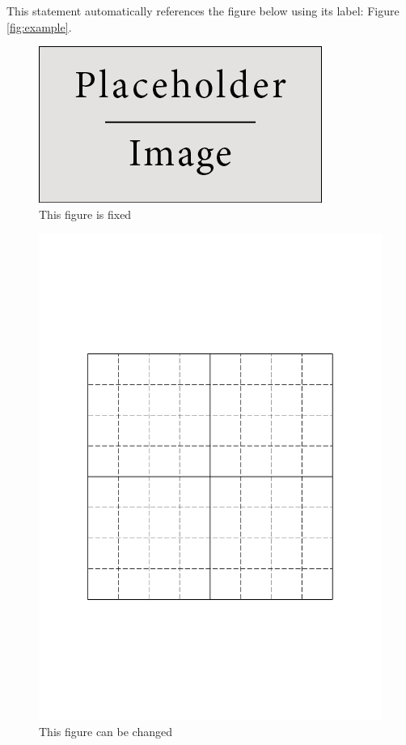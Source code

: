 \documentclass[12pt,a4paper]{article} %
\begin{document}
This statement automatically references the figure below using its label: Figure \ref{fig:example}.

\begin{figure}[h]
    \centering
    \includegraphics[width=\textwidth]{../../1-Report_Template/Images/placeholder.jpg}
   \caption{This figure is fixed}
\end{figure}



\begin{figure}[h]
    \centering
    \includegraphics[width=\textwidth]{../../2-Calculation_Output/Temporal_Images/fii_s003.pdf}
    \caption{This figure can be changed}
\end{figure}
\end{document}
